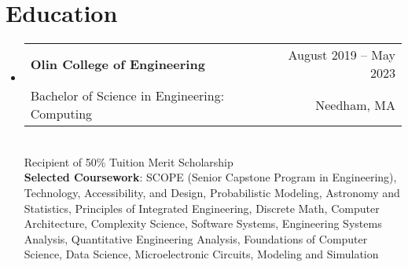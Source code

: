 \documentclass[letterpaper,10pt]{article}
\makeatletter
\newcommand{\resumeSubheading}[4]{
  \vspace{-2pt}\item
    \begin{tabular*}{0.97\textwidth}[t]{l@{\extracolsep{\fill}}r}
      \textbf{#1} & #2 \\
      \small#3 & \small #4 \\
    \end{tabular*}\vspace{-7pt}
}
\newcommand{\resumeSubHeadingListStart}{\begin{itemize}[leftmargin=0.15in, label={}]}
\newcommand{\resumeSubHeadingListEnd}{\end{itemize}}
\makeatother
\begin{document}
\section{Education}
  \resumeSubHeadingListStart
    \resumeSubheading
      {Olin College of Engineering}{August 2019 -- May 2023}
      {Bachelor of Science in Engineering: Computing}{Needham, MA} 
      \vspace{2pt} \\
      \small Recipient of 50\% Tuition Merit Scholarship \normalsize\\
      \vspace{2pt}
      \textbf{Selected Coursework}{\small: SCOPE (Senior Capstone Program in Engineering), Technology, Accessibility, and Design, Probabilistic Modeling, Astronomy and Statistics, Principles of Integrated Engineering, Discrete Math, Computer Architecture, Complexity Science, Software Systems, Engineering Systems Analysis, Quantitative Engineering Analysis, Foundations of Computer Science, Data Science, Microelectronic Circuits, Modeling and Simulation\normalsize}
  \resumeSubHeadingListEnd




%
\end{document}

